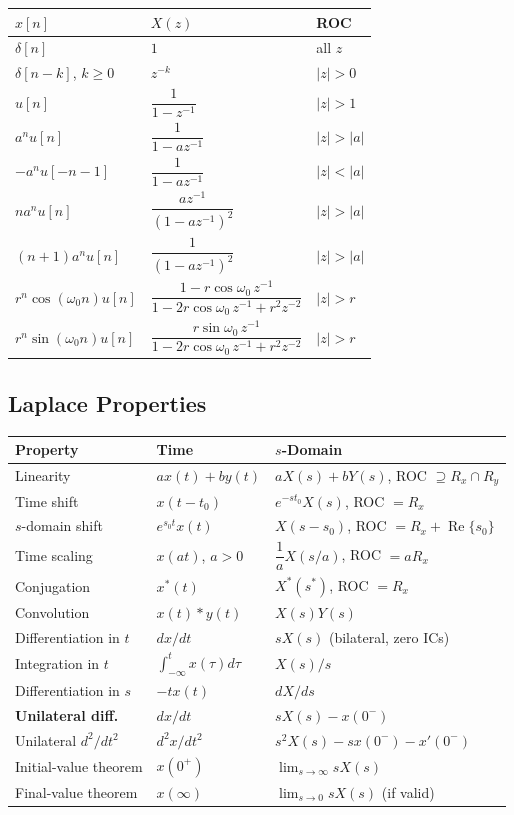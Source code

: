 \documentclass{article}
\begin{document}
\begin{center}
\begin{tabular}{lll}
\toprule
$x[n]$ & $X(z)$ & ROC \\
\midrule
$\delta[n]$ & $1$ & all $z$ \\
$\delta[n-k]$, $k\ge 0$ & $z^{-k}$ & $|z|>0$ \\
$u[n]$ & $\dfrac{1}{1-z^{-1}}$ & $|z|>1$ \\
$a^n u[n]$ & $\dfrac{1}{1-az^{-1}}$ & $|z|>|a|$ \\
$-a^n u[-n-1]$ & $\dfrac{1}{1-az^{-1}}$ & $|z|<|a|$ \\
$na^n u[n]$ & $\dfrac{az^{-1}}{(1-az^{-1})^2}$ & $|z|>|a|$ \\
$(n+1)a^n u[n]$ & $\dfrac{1}{(1-az^{-1})^2}$ & $|z|>|a|$ \\
$r^n \cos(\omega_0 n)u[n]$ & $\dfrac{1-r\cos\omega_0\, z^{-1}}{1-2r\cos\omega_0\, z^{-1}+r^2 z^{-2}}$ & $|z|>r$ \\
$r^n \sin(\omega_0 n)u[n]$ & $\dfrac{r\sin\omega_0\, z^{-1}}{1-2r\cos\omega_0\, z^{-1}+r^2 z^{-2}}$ & $|z|>r$ \\
\bottomrule
\end{tabular}
\end{center}

\subsection{Laplace Properties}

\begin{center}
\begin{tabular}{lll}
\toprule
Property & Time & $s$-Domain \\
\midrule
Linearity & $ax(t)+by(t)$ & $aX(s)+bY(s)$, ROC $\supseteq R_x\cap R_y$ \\
Time shift & $x(t-t_0)$ & $e^{-st_0}X(s)$, ROC $=R_x$ \\
$s$-domain shift & $e^{s_0 t}x(t)$ & $X(s-s_0)$, ROC $=R_x+\operatorname{Re}\{s_0\}$ \\
Time scaling & $x(at)$, $a>0$ & $\dfrac{1}{a}X(s/a)$, ROC $=aR_x$ \\
Conjugation & $x^*(t)$ & $X^*(s^*)$, ROC $=R_x$ \\
Convolution & $x(t)*y(t)$ & $X(s)Y(s)$ \\
Differentiation in $t$ & $dx/dt$ & $sX(s)$ (bilateral, zero ICs) \\
Integration in $t$ & $\int_{-\infty}^t x(\tau)d\tau$ & $X(s)/s$ \\
Differentiation in $s$ & $-tx(t)$ & $dX/ds$ \\
\textbf{Unilateral diff.} & $dx/dt$ & $sX(s)-x(0^-)$ \\
Unilateral $d^2/dt^2$ & $d^2x/dt^2$ & $s^2X(s)-sx(0^-)-x'(0^-)$ \\
Initial-value theorem & $x(0^+)$ & $\lim_{s\to\infty} sX(s)$ \\
Final-value theorem & $x(\infty)$ & $\lim_{s\to 0} sX(s)$ (if valid) \\
\bottomrule
\end{tabular}
\end{center}
\end{document}
